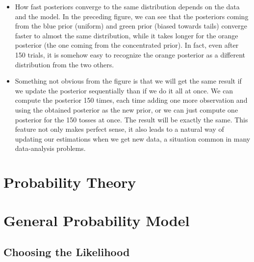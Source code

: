 \begin{example}
\begin{itemize}
        \item How fast posteriors converge to the same distribution depends on the data and the model. In the preceding figure, we can see that the posteriors coming from the blue prior (uniform) and green prior (biased towards tails) converge faster to almost the same distribution, while it takes longer for the orange posterior (the one coming from the concentrated prior). In fact, even after 150 trials, it is somehow easy to recognize the orange posterior as a different distribution from the two others.
        
        \item Something not obvious from the figure is that we will get the same result if we update the posterior sequentially than if we do it all at once. We can compute the posterior 150 times, each time adding one more observation and using the obtained posterior as the new prior, or we can just compute one posterior for the 150 tosses at once. The result will be exactly the same. This feature not only makes perfect sense, it also leads to a natural way of updating our estimations when we get new data, a situation common in many data-analysis problems.\qedhere
    \end{itemize}
        

\end{example}

\section{Probability Theory}

\section{General Probability Model}

\subsection{Choosing the Likelihood}

\clearpage
\printbibliography[segment=\therefsegment,heading=subbibintoc]